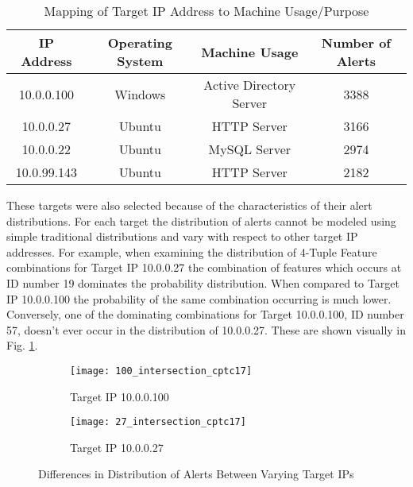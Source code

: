 \begin{table}[!htbp]
	\caption{Mapping of Target IP Address to Machine Usage/Purpose}
	\label{tab:mapping}
	\centering
	\begin{tabular}{c|c|c|c}
		\textbf{IP Address} & \textbf{Operating System} & \textbf{Machine Usage} & \textbf{Number of Alerts}\\
		\hline
		10.0.0.100 & Windows & Active Directory Server & 3388\\
		\hline
		10.0.0.27 & Ubuntu & HTTP Server & 3166\\
		\hline
		10.0.0.22 & Ubuntu & MySQL Server & 2974\\
		\hline
		10.0.99.143 & Ubuntu & HTTP Server & 2182
	\end{tabular}
\end{table}

These targets were also selected because of the characteristics of their alert distributions. For each target the distribution of alerts cannot be modeled using simple traditional distributions and vary with respect to other target IP addresses. For example, when examining the distribution of 4-Tuple Feature combinations for Target IP 10.0.0.27 the combination of features which occurs at ID number 19 dominates the probability distribution. When compared to Target IP 10.0.0.100 the probability of the same combination occurring is much lower. Conversely, one of the dominating combinations for Target 10.0.0.100, ID number 57, doesn't ever occur in the distribution of 10.0.0.27. These are shown visually in Fig. \ref{fig:histograms}.
\begin{figure}[!htbp]
	\centering

	\begin{subfigure}{.75\textwidth}
		\texttt{[image: 100\_intersection\_cptc17]}
	\end{subfigure}%
	\begin{subfigure}{.25\textwidth}
		\caption{
			Target IP 10.0.0.100
		}
	\end{subfigure}%

	\begin{subfigure}{.75\textwidth}
		\texttt{[image: 27\_intersection\_cptc17]}
	\end{subfigure}%
	\begin{subfigure}{.25\textwidth}
		\caption{
			Target IP 10.0.0.27
		}
	\end{subfigure}%
	\caption{Differences in Distribution of Alerts Between Varying Target IPs}
	\label{fig:histograms}
\end{figure}

